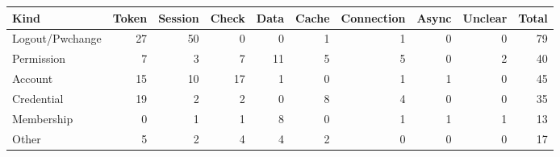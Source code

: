 \begin{tabular}{lrrrrrrrrr}
\toprule
Kind & Token & Session & Check & Data & Cache & Connection & Async & Unclear & Total \\
\midrule
Logout/Pwchange & 27 & 50 & 0 & 0 & 1 & 1 & 0 & 0 & 79 \\
Permission & 7 & 3 & 7 & 11 & 5 & 5 & 0 & 2 & 40 \\
Account & 15 & 10 & 17 & 1 & 0 & 1 & 1 & 0 & 45 \\
Credential & 19 & 2 & 2 & 0 & 8 & 4 & 0 & 0 & 35 \\
Membership & 0 & 1 & 1 & 8 & 0 & 1 & 1 & 1 & 13 \\
Other & 5 & 2 & 4 & 4 & 2 & 0 & 0 & 0 & 17 \\
\bottomrule
\end{tabular}
